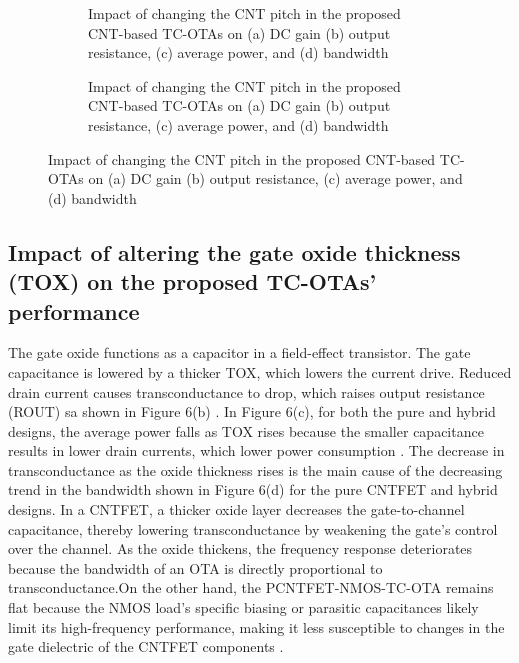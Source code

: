 \begin{figure}[htbp]
  \centering
  \begin{subfigure}[b]{0.48\linewidth}
    \centering
    \caption{Impact of changing the CNT pitch in the proposed CNT-based TC-OTAs on (a) DC gain (b) output resistance, (c) average power, and (d) bandwidth}

  \end{subfigure}
  \hfill
  \begin{subfigure}[b]{0.48\linewidth}
    \centering
    \caption{Impact of changing the CNT pitch in the proposed CNT-based TC-OTAs on (a) DC gain (b) output resistance, (c) average power, and (d) bandwidth}

  \end{subfigure}
  \caption{Impact of changing the CNT pitch in the proposed CNT-based TC-OTAs on (a) DC gain (b) output resistance, (c) average power, and (d) bandwidth}

  \label{fig:group_2vx1j}
\end{figure}

\subsection*{Impact of altering the gate oxide thickness (TOX) on the proposed TC-OTAs' performance}

The gate oxide functions as a capacitor in a field-effect transistor. The gate
capacitance is lowered by a thicker TOX, which lowers the current drive. Reduced
drain current causes transconductance to drop, which raises output resistance
(ROUT) sa shown in Figure 6(b) \cite{ref40}.
In Figure 6(c), for both the pure and hybrid designs, the average power falls as
TOX rises because the smaller capacitance results in lower drain currents, which
lower power consumption \cite{ref39,ref40,ref41}.
The decrease in transconductance as the oxide thickness rises is the main cause
of the decreasing trend in the bandwidth shown in Figure 6(d) for the pure
CNTFET and hybrid designs. In a CNTFET, a thicker oxide layer decreases the
gate-to-channel capacitance, thereby lowering transconductance by weakening the
gate's control over the channel. As the oxide thickens, the frequency response
deteriorates because the bandwidth of an OTA is directly proportional to
transconductance.On the other hand, the PCNTFET-NMOS-TC-OTA remains flat because
the NMOS load's specific biasing or parasitic capacitances likely limit its
high-frequency performance, making it less susceptible to changes in the gate
dielectric of the CNTFET components \cite{ref6,ref39}.


